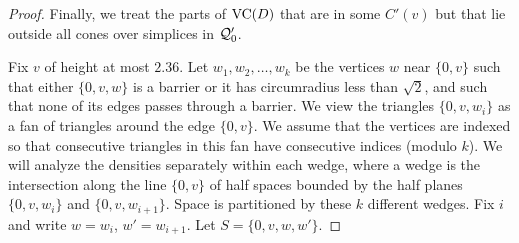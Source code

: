 \begin{proof}

Finally, we treat the parts of ${\operatorname{VC}}(D)$ that are in some
$C'(v)$ but that lie outside all cones over simplices in
${\mathcal Q}'_0$.


Fix $v$ of height at most $2.36$.  Let $w_1,w_2,\ldots,w_k$ be the
vertices $w$ near $\{0,v\}$ such that either $\{0,v,w\}$ is a
barrier or it has circumradius less than $\sqrt2$, and such that
none of its edges passes through a barrier. We view the triangles
$\{0,v,w_i\}$ as a fan of triangles around the edge $\{0,v\}$.  We
assume that the vertices are indexed so that consecutive triangles
in this fan have consecutive indices (modulo $k$). We will analyze
the densities separately within each wedge, where a wedge is the
intersection along the line $\{0,v\}$ of half spaces bounded by
the half planes $\{0,v,w_i\}$ and $\{0,v,w_{i+1}\}$.  Space is
partitioned by these $k$ different wedges. Fix $i$ and write
$w=w_i$, $w'=w_{i+1}$.  Let $S=\{0,v,w,w'\}$.





\end{proof}
